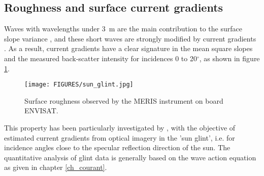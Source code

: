 \subsection{Roughness and surface current gradients}
Waves with wavelengths under 3~m are the main contribution to the surface slope variance \citep[e.g.][]{Cox&Munk1954,Vandemark&al.2002}, and 
these short waves are strongly modified by current gradients \citep[e.g.][]{Phillips1984}. As a result, current gradients have a clear signature in the mean 
square slopes and the measured back-scatter intensity for incidences 0 to 20$^\circ$, as shown in figure \ref{fig:glint}. 
\begin{figure}
\centerline{\texttt{[image: FIGURES/sun\_glint.jpg]}}
  \caption{Surface roughness observed by the MERIS instrument on board ENVISAT.}
  \label{fig:glint}
\end{figure}
This property has been particularly investigated by 
\cite{Kudryavtsev&al.2012,Rascle&al.2014,Rascle&al.2017}, with the objective of estimated current gradients from optical imagery in the 'sun glint', i.e. 
for incidence angles close to the specular reflection direction of the sun.  The quantitative analysis of glint data is generally based on the wave action equation 
as given in chapter \ref{ch_courant}.


